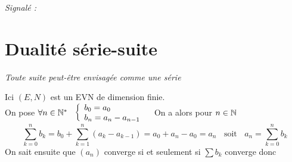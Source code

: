		 \medskip

		\textit{\small Signalé :}

		 \medskip
		

	\section{Dualité série-suite}
		
		\textit{Toute suite peut-être envisagée comme une série}
			
		Ici $(E,N)$ est un EVN de dimension finie.\\${}$ \\On pose $\forall n\in{\mathbb{N}}^* ~~ \left\{ \begin{array}{l}  b_0 = a_0 \\ b_n = a_n - a_{n-1} \end{array}
			\right.~~$ On a alors pour $n\in {\mathbb{N}}$ \\
			\[ \sum_{k=0}^{n} b_k = b_0 + \sum_{k=1}^{n} (a_k - a_{k-1} ) = a_0 +a_n - a_0 = a_n ~~~~\mathrm{soit} ~~~~ a_n = \sum_{k=0}^{n} b_k\]
			On sait ensuite que $(a_n)$ converge si et seulement si $\sum b_k$ converge donc 
			
		\begin{center}
		\end{center} \medskip
		

\fin